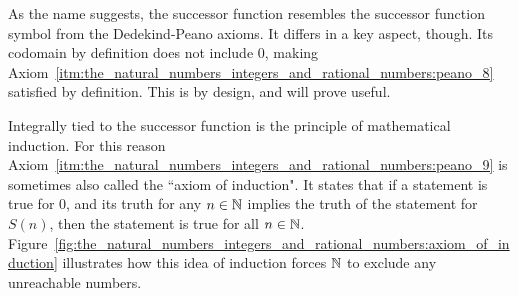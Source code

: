\documentclass[../main.tex]{subfiles}
\begin{document}
As the name suggests, the successor function resembles the successor function symbol from the Dedekind-Peano axioms. It differs in a key aspect, though. Its codomain by definition does not include $0$, making Axiom~\ref{itm:the_natural_numbers_integers_and_rational_numbers:peano_8} satisfied by definition. This is by design, and will prove useful.

Integrally tied to the successor function is the principle of mathematical induction. For this reason Axiom~\ref{itm:the_natural_numbers_integers_and_rational_numbers:peano_9} is sometimes also called the ``axiom of induction". It states that if a statement is true for $0$, and its truth for any $n\in\mathbb{N}$ implies the truth of the statement for $S(n)$, then the statement is true for all $n\in\mathbb{N}$. Figure~\ref{fig:the_natural_numbers_integers_and_rational_numbers:axiom_of_induction} illustrates how this idea of induction forces $\mathbb{N}$ to exclude any unreachable numbers.
\end{document}
